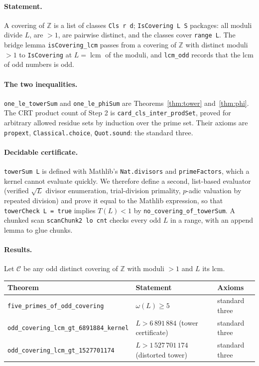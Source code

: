 \documentclass[11pt]{article}
\theoremstyle{definition}
\theoremstyle{remark}
\newcommand{\Z}{\mathbb{Z}}
\newcommand{\lcm}{\operatorname{lcm}}
\newcommand{\lean}[1]{\texttt{#1}}
\begin{document}
\paragraph{Statement.} A covering of $\Z$ is a list of classes \lean{Cls r d}; \lean{IsCovering L S} packages: all moduli divide $L$, are $> 1$, are pairwise distinct, and the classes cover \lean{range L}. The bridge lemma \lean{isCovering\_lcm} passes from a covering of $\Z$ with distinct moduli $> 1$ to \lean{IsCovering} at $L = \lcm$ of the moduli, and \lean{lcm\_odd} records that the lcm of odd numbers is odd.

\paragraph{The two inequalities.} \lean{one\_le\_towerSum} and \lean{one\_le\_phiSum} are Theorems~\ref{thm:tower} and~\ref{thm:phi}. The CRT product count of Step 2 is \lean{card\_cls\_inter\_prodSet}, proved for arbitrary allowed residue sets by induction over the prime set. Their axioms are \lean{propext}, \lean{Classical.choice}, \lean{Quot.sound}: the standard three.

\paragraph{Decidable certificate.} \lean{towerSum L} is defined with Mathlib's \lean{Nat.divisors} and \lean{primeFactors}, which a kernel cannot evaluate quickly. We therefore define a second, list-based evaluator (verified $\sqrt L$ divisor enumeration, trial-division primality, $p$-adic valuation by repeated division) and prove it equal to the Mathlib expression, so that \lean{towerCheck L = true} implies $T(L) < 1$ by \lean{no\_covering\_of\_towerSum}. A chunked scan \lean{scanChunk2 lo cnt} checks every odd $L$ in a range, with an append lemma to glue chunks.

\paragraph{Results.} Let $\mathcal{C}$ be any odd distinct covering of $\Z$ with moduli $> 1$ and $L$ its lcm.

\begin{center}
\begin{tabular}{@{}lll@{}}
\toprule
Theorem & Statement & Axioms \\
\midrule
\lean{five\_primes\_of\_odd\_covering} & $\omega(L) \ge 5$ & standard three \\
\lean{odd\_covering\_lcm\_gt\_6891884\_kernel} & $L > 6\,891\,884$ (tower certificate) & standard three \\
\lean{odd\_covering\_lcm\_gt\_1527701174} & $L > 1\,527\,701\,174$ (distorted tower) & standard three \\
\bottomrule
\end{tabular}
\end{center}
\end{document}
